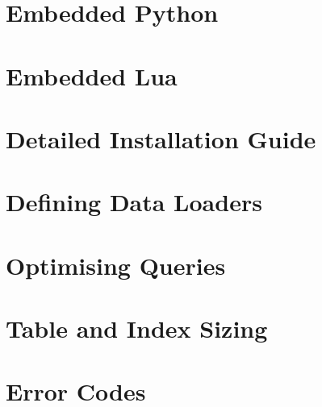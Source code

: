 \documentclass{scrreprt}
\begin{document}
\chapter{Embedded Python}\label{chpt_pythonemb}

\chapter{Embedded Lua}\label{chpt_luaemb}

\chapter{Detailed Installation Guide}\label{chpt_install}

\chapter{Defining Data Loaders}\label{chpt_loader}

\chapter{Optimising Queries}\label{chpt_opt}

\chapter{Table and Index Sizing}\label{chpt_sizing}

\chapter{Error Codes}\label{chpt_errors}
\end{document}
